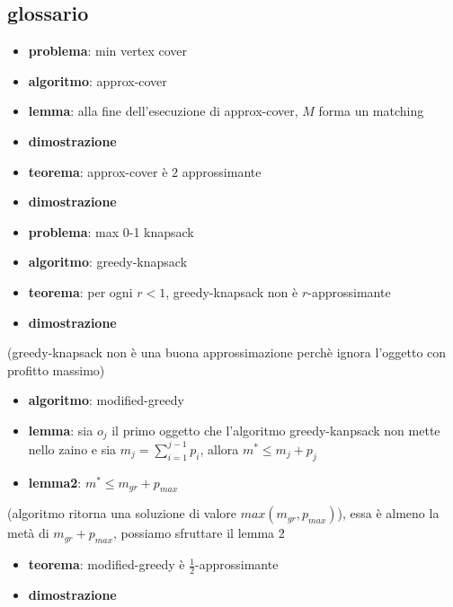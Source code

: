 \subsection*{glossario}

    \begin{itemize}

\item
  \textbf{problema}: min vertex cover
\item
  \textbf{algoritmo}: approx-cover
\item
  \textbf{lemma}: alla fine dell'esecuzione di approx-cover, \(M\) forma
  un matching
\item
  \textbf{dimostrazione}
\item
  \textbf{teorema}: approx-cover è \(2\) approssimante
\item
  \textbf{dimostrazione}
\end{itemize}

    \begin{itemize}

\item
  \textbf{problema}: max 0-1 knapsack
\item
  \textbf{algoritmo}: greedy-knapsack
\item
  \textbf{teorema}: per ogni \(r < 1\), greedy-knapsack non è
  \(r\)-approssimante
\item
  \textbf{dimostrazione}
\end{itemize}

(greedy-knapsack non è una buona approssimazione perchè ignora l'oggetto
con profitto massimo)

\begin{itemize}
\item
  \textbf{algoritmo}: modified-greedy
\item
  \textbf{lemma}: sia \(o_j\) il primo oggetto che l'algoritmo
  greedy-kanpsack non mette nello zaino e sia
  \(m_j = \sum_{i=1}^{j-1}p_i\), allora \(m^* \leq m_j + p_j\)
\item
  \textbf{lemma2}: \(m^* \leq m_{gr} + p_{max}\)
\end{itemize}

(algoritmo ritorna una soluzione di valore \(max(m_{gr}, p_{max})\)),
essa è almeno la metà di \(m_{gr} + p_{max}\), possiamo sfruttare il
lemma 2

\begin{itemize}

\item
	\textbf{teorema}: modified-greedy è \({\frac{1}{2}}\)-approssimante
\item
  \textbf{dimostrazione}
\end{itemize}

